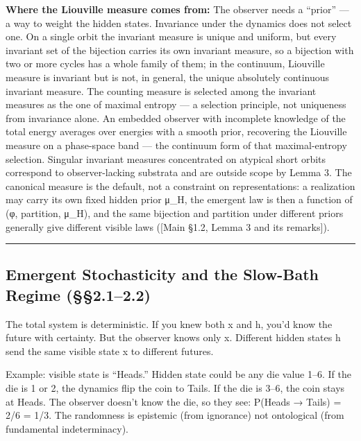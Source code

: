 \documentclass[
]{article}
\begin{document}
\textbf{Where the Liouville measure comes from:} The observer needs a
``prior'' --- a way to weight the hidden states. Invariance under the
dynamics does not select one. On a single orbit the invariant measure is
unique and uniform, but every invariant set of the bijection carries its
own invariant measure, so a bijection with two or more cycles has a
whole family of them; in the continuum, Liouville measure is invariant
but is not, in general, the unique absolutely continuous invariant
measure. The counting measure is selected among the invariant measures
as the one of maximal entropy --- a selection principle, not uniqueness
from invariance alone. An embedded observer with incomplete knowledge of
the total energy averages over energies with a smooth prior, recovering
the Liouville measure on a phase-space band --- the continuum form of
that maximal-entropy selection. Singular invariant measures concentrated
on atypical short orbits correspond to observer-lacking substrata and
are outside scope by Lemma 3. The canonical measure is the default, not
a constraint on representations: a realization may carry its own fixed
hidden prior μ\_H, the emergent law is then a function of (φ, partition,
μ\_H), and the same bijection and partition under different priors
generally give different visible laws ({[}Main §1.2, Lemma 3 and its
remarks{]}).

\begin{center}\rule{0.5\linewidth}{0.5pt}\end{center}

\hypertarget{emergent-stochasticity-and-the-slow-bath-regime-2.12.2}{%
\subsection{Emergent Stochasticity and the Slow-Bath Regime
(§§2.1--2.2)}\label{emergent-stochasticity-and-the-slow-bath-regime-2.12.2}}

The total system is deterministic. If you knew both x and h, you'd know
the future with certainty. But the observer knows only x. Different
hidden states h send the same visible state x to different futures.

Example: visible state is ``Heads.'' Hidden state could be any die value
1--6. If the die is 1 or 2, the dynamics flip the coin to Tails. If the
die is 3--6, the coin stays at Heads. The observer doesn't know the die,
so they see: P(Heads → Tails) = 2/6 = 1/3. The randomness is epistemic
(from ignorance) not ontological (from fundamental indeterminacy).
\end{document}
